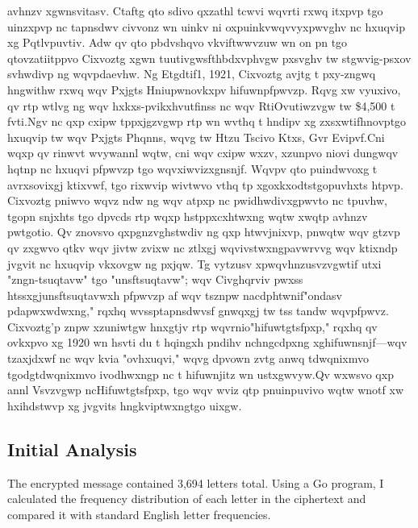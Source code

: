 \documentclass[a4paper,12pt]{article}
\begin{document}
avhnzv xgwnsvitasv. Ctaftg qto sdivo qxzathl tcwvi wqvrti rxwq itxpvp tgo
uinzxpvp nc tapnsdwv civvonz wn uinkv ni oxpuinkvwqvvyxpwvghv nc hxuqvip xg
Pqtlvpuvtiv. Adw qv qto pbdvshqvo vkviftwwvzuw wn on pn tgo qtovzatiitppvo
Cixvoztg xgwn tuutivgwsfthbdxvphvgw pxsvghv tw stgwvig-psxov svhwdivp ng
wqvpdaevhw. Ng Etgdtif1, 1921, Cixvoztg avjtg t pxy-zngwq hngwithw rxwq wqv
Pxjgts Hniupwnovkxpv hifuwnpfpwvzp. Rqvg xw vyuxivo, qv rtp wtlvg ng wqv
hxkxs-pvikxhvutfinss nc wqv RtiOvutiwzvgw tw \$4,500 t fvti.Ngv nc qxp cxipw
tppxjgzvgwp rtp wn wvthq t hndipv xg zxsxwtifhnovptgo hxuqvip tw wqv Pxjgts
Phqnns, wqvg tw Htzu Tscivo Ktxs, Gvr Evipvf.Cni wqxp qv rinwvt wvywannl wqtw,
cni wqv cxipw wxzv, xzunpvo niovi dungwqv hqtnp nc hxuqvi pfpwvzp tgo
wqvxiwvizxgnsnjf. Wqvpv qto puindwvoxg t avrxsovixgj ktixvwf, tgo rixwvip
wivtwvo vthq tp xgoxkxodtstgopuvhxts htpvp. Cixvoztg pniwvo wqvz ndw ng wqv
atpxp nc pwidhwdivxgpwvto nc tpuvhw, tgopn snjxhts tgo dpvcds rtp wqxp
hstppxcxhtwxng wqtw xwqtp avhnzv pwtgotio. Qv znovsvo qxpgnzvghstwdiv ng qxp
htwvjnixvp, pnwqtw wqv gtzvp qv zxgwvo qtkv wqv jivtw zvixw nc ztlxgj
wqvivstwxngpavwrvvg wqv ktixndp jvgvit nc hxuqvip vkxovgw ng pxjqw. Tg vytzusv
xpwqvhnzusvzvgwtif utxi "zngn-tsuqtavw" tgo "unsftsuqtavw"; wqv Civghqrviv
pwxss htssxgjunsftsuqtavwxh pfpwvzp af wqv tsznpw nacdphtwnif"ondasv
pdapwxwdwxng," rqxhq wvssptapnsdwvsf gnwqxgj tw tss tandw wqvpfpwvz. Cixvoztg'p
znpw xzuniwtgw hnxgtjv rtp wqvrnio"hifuwtgtsfpxp," rqxhq qv ovkxpvo xg 1920 wn
hsvti du t hqingxh pndihv nchngcdpxng xghifuwnsnjf—wqv tzaxjdxwf nc wqv kvia
"ovhxuqvi," wqvg dpvown zvtg anwq tdwqnixmvo tgodgtdwqnixmvo ivodhwxngp nc t
hifuwnjitz wn ustxgwvyw.Qv wxwsvo qxp annl Vsvzvgwp ncHifuwtgtsfpxp, tgo wqv
wviz qtp pnuinpuvivo wqtw wnotf xw hxihdstwvp xg jvgvits hngkviptwxngtgo uixgw.
\subsection{Initial Analysis}
\label{sec:org541de42}
The encrypted message contained 3,694 letters total. Using a Go program, I calculated the frequency distribution of each letter in the ciphertext and compared it with standard English letter frequencies.
\end{document}
